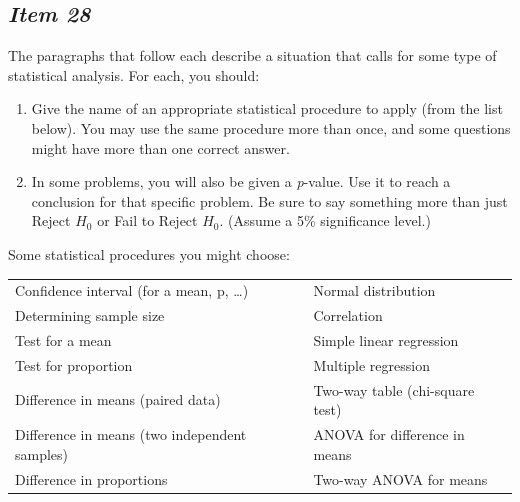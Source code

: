 \subsection{\textbf{\textit{Item 28}}}


The paragraphs that follow each describe a situation that calls for some type of statistical analysis. For each, you should:


\renewcommand{\labelenumi}{\arabic{enumi}.}


\begin{enumerate}[leftmargin=1cm, itemsep=.2em]


\item Give the name of an appropriate statistical procedure to apply (from the list below). You may use the same procedure more than once, and some questions might have more than one correct answer.


\item In some problems, you will also be given a \textit{p}-value. Use it to reach a conclusion for that specific problem. Be sure to say something more than just Reject $H_0$ or Fail to Reject $H_0$. (Assume a 5\% significance level.) 


\end{enumerate}





Some statistical procedures you might choose:


\begin{table}[!ht]


\begin{center}


\begin{tabular}{ll}


\hline


Confidence interval (for a mean, p, \ldots) & Normal distribution\\


Determining sample size & Correlation\\


Test for a mean & Simple linear regression\\


Test for proportion & Multiple regression\\


Difference in means (paired data) & Two-way table (chi-square test)\\


Difference in means (two independent samples) & ANOVA for difference in means\\


Difference in proportions & Two-way ANOVA for means\\


\hline


\end{tabular}


\end{center}


\end{table}





